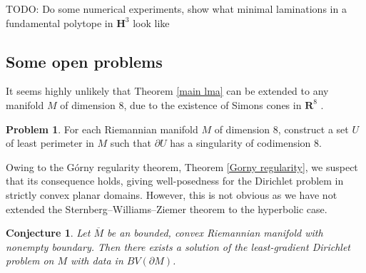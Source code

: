 \documentclass[reqno,12pt,letterpaper]{amsart}
\newcommand{\RR}{\mathbf{R}}
\newcommand{\Hyp}{\mathbf H}
\newcommand{\Orth}{\mathbf{O}}
\newtheorem{conjecture}[theorem]{Conjecture}
\theoremstyle{definition}
\newtheorem{problem}[theorem]{Problem}
\numberwithin{equation}{section}
\begin{document}
TODO: Do some numerical experiments, show what minimal laminations in a fundamental polytope in $\Hyp^3$ look like



\subsection{Some open problems}
%
%

It seems highly unlikely that Theorem \ref{main lma} can be extended to any manifold $M$ of dimension $8$, due to the existence of Simons cones in $\RR^8$ \cite[Theorem A]{BOMBIERI1969}.

\begin{problem}
    For each Riemannian manifold $M$ of dimension $8$, construct a set $U$ of least perimeter in $M$ such that $\partial U$ has a singularity of codimension $8$.
\end{problem}

Owing to the G\'orny regularity theorem, Theorem \ref{Gorny regularity}, we suspect that its consequence \cite[Theorem 1.1]{górny2017planar} holds, giving well-posedness for the Dirichlet problem in strictly convex planar domains.
However, this is not obvious as we have not extended the Sternberg--Williams--Ziemer theorem \cite{ZiemerWilliamsSternberg1992} to the hyperbolic case.

\begin{conjecture}
Let $\overline M$ be an bounded, convex Riemannian manifold with nonempty boundary.
Then there exists a solution of the least-gradient Dirichlet problem on $M$ with data in $BV(\partial M)$.
\end{conjecture}
\end{document}
